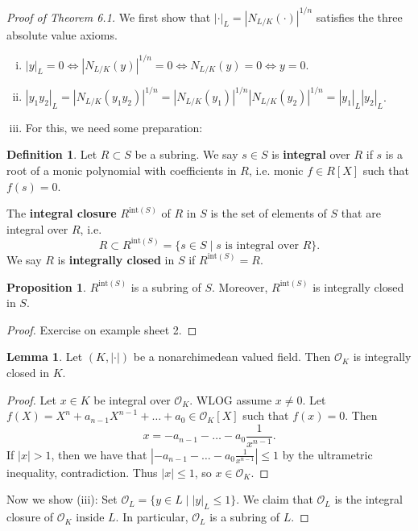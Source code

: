 \documentclass{article}
\theoremstyle{definition}
\newtheorem{lemma}[theorem]{Lemma}
\newtheorem{prop}[theorem]{Proposition}
\newtheorem{defn}{Definition}[section]
\begin{document}
\begin{proof}[Proof of Theorem 6.1]
    We first show that $|\cdot|_L = |N_{L/K}(\cdot )|^{1/n}$ satisfies the three absolute value axioms.
    \begin{enumerate}[(i)]
        \item $|y|_L = 0 \iff |N_{L/K}(y)|^{1/n} = 0 \iff N_{L/K}(y) = 0 \iff y = 0$.
        \item $|y_1y_2|_L = |N_{L/K}(y_1y_2)|^{1/n} = |N_{L/K}(y_1)|^{1/n}|N_{L/K}(y_2)|^{1/n} = |y_1|_L|y_2|_L$.
        \item For this, we need some preparation:
    \end{enumerate}
    \begin{defn}
        Let $R \subset S$ be a subring. We say $s \in S$ is \textbf{integral} over $R$ if $s$ is a root of a monic polynomial with coefficients in $R$, i.e. monic $f \in R[X]$ such that $f(s)=0$.
        \vspace{1mm}
         
        The \textbf{integral closure} $R^{\text{int}(S)}$ of $R$ in $S$ is the set of elements of $S$ that are integral over $R$, i.e. \[
        R \subset R^{\text{int}(S)} = \{s \in S \mid s \text{ is integral over }R\}.
        \]
        We say $R$ is \textbf{integrally closed} in $S$ if $R^{\text{int}(S)} = R$.
    \end{defn}
    \begin{prop}
        $R^{\text{int}(S)}$ is a subring of $S$. Moreover, $R^{\text{int}(S)}$ is integrally closed in $S$.
    \end{prop}
    \begin{proof}
        Exercise on example sheet 2.
    \end{proof}
    \begin{lemma}
        Let $(K,|\cdot|)$ be a nonarchimedean valued field. Then $\mathcal{O}_K$ is integrally closed in $K$.
    \end{lemma}
    \begin{proof}
        Let $x \in K$ be integral over $\mathcal{O}_K$. WLOG assume $x \neq 0$. Let $f(X) = X^n + a_{n-1}X^{n-1}+\ldots+a_0 \in \mathcal{O}_K[X]$ such that $f(x)=0$. Then \[
        x = -a_{n-1} - \ldots - a_0 \frac{1}{x^{n-1}}.
        \] 
        If $|x|>1$, then we have that $\left|-a_{n-1}- \ldots - a_0\frac{1}{x^{n-1}}\right|\le 1$ by the ultrametric inequality, contradiction. Thus $|x| \le 1$, so $x \in \mathcal{O}_K$.
    \end{proof}
    Now we show (iii): Set $\mathcal{O}_L = \{y \in L \mid |y|_L \le 1\}$. We claim that $\mathcal{O}_L$ is the integral closure of $\mathcal{O}_K$ inside $L$. In particular, $\mathcal{O}_L$ is a subring of $L$. 
    \vspace{1mm}
     

\end{proof}
\end{document}
